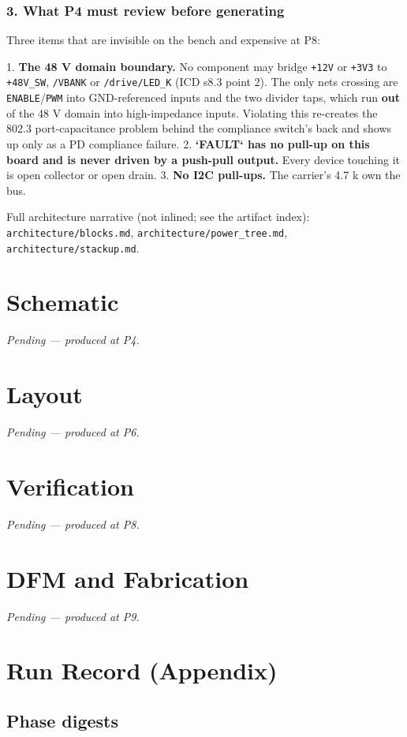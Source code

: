 \documentclass[11pt,a4paper]{article}
\begin{document}
\subsubsection*{3. What P4 must review before generating}
Three items that are invisible on the bench and expensive at P8:

1. \textbf{The 48 V domain boundary.} No component may bridge \texttt{+12V} or \texttt{+3V3} to \texttt{+48V\_SW}, \texttt{/VBANK} or \texttt{/drive/LED\_K} (ICD s8.3 point 2). The only nets crossing are \texttt{ENABLE}/\texttt{PWM} into GND-referenced inputs and the two divider taps, which run \textbf{out} of the 48 V domain into high-impedance inputs. Violating this re-creates the 802.3 port-capacitance problem behind the compliance switch's back and shows up only as a PD compliance failure. 2. \textbf{`FAULT` has no pull-up on this board and is never driven by a push-pull output.} Every device touching it is open collector or open drain. 3. \textbf{No I2C pull-ups.} The carrier's 4.7 k own the bus.

Full architecture narrative (not inlined; see the artifact index): \texttt{architecture/blocks.md}, \texttt{architecture/power\_tree.md}, \texttt{architecture/stackup.md}.
\section{Schematic}
\emph{Pending --- produced at P4.}
\section{Layout}
\emph{Pending --- produced at P6.}
\section{Verification}
\emph{Pending --- produced at P8.}
\section{DFM and Fabrication}
\emph{Pending --- produced at P9.}
\section{Run Record (Appendix)}
\subsection*{Phase digests}
\end{document}
